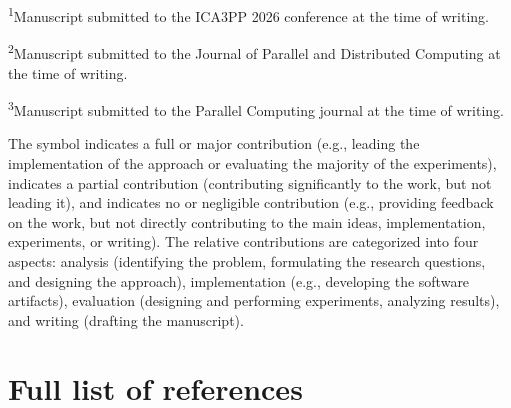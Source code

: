 \begin{center}
\begin{minipage}{\textwidth}
\begin{tabular}{cllcccc}
  \bottomrule
\end{tabular}
\par\vspace{0.5ex}
\raggedright\footnotesize
\textsuperscript{1}Manuscript submitted to the ICA3PP 2026 conference at the time of writing.\par
\textsuperscript{2}Manuscript submitted to the Journal of Parallel and Distributed Computing at the time of writing.\par
\textsuperscript{3}Manuscript submitted to the Parallel Computing journal at the time of writing.
\end{minipage}
\end{center}

The \contF symbol indicates a full or major contribution (e.g., leading the implementation of the approach or evaluating the majority of the experiments), \contP indicates a partial contribution (contributing significantly to the work, but not leading it), and \contN indicates no or negligible contribution (e.g., providing feedback on the work, but not directly contributing to the main ideas, implementation, experiments, or writing). The relative contributions are categorized into four aspects: analysis (identifying the problem, formulating the research questions, and designing the approach), implementation (e.g., developing the software artifacts), evaluation (designing and performing experiments, analyzing results), and writing (drafting the manuscript).


\section*{Full list of references}

